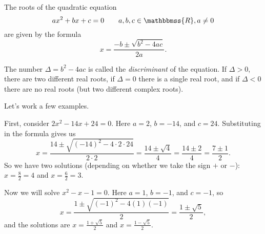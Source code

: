 \documentclass[12pt]{article}
\newcommand{\R}{\mathbbmss{R}}
\begin{document}
The roots of the quadratic equation
\[
  ax^2+bx+c=0\qquad{a,b,c\in\R,a\neq 0}
\]
are given by the formula
\[
  x=\frac{-b\pm\sqrt{b^2-4ac}}{2a}.
\]

The number $\Delta=b^2-4ac$ is called the \emph{discriminant} of the equation.
If $\Delta>0$, there are two different real roots,
if $\Delta=0$ there is a single real root,
and if $\Delta<0$ there are no real roots (but two different complex roots).

Let's work a few examples.

First, consider $2x^2-14x+24=0$.
Here $a=2$, $b=-14$, and $c=24$.
Substituting in the formula gives us
\[
  x=\frac{14\pm \sqrt{(-14)^2-4\cdot2\cdot24}}{2\cdot 2}
   =\frac{14\pm\sqrt{4}}{4}
   =\frac{14\pm2}{4}
   =\frac{7\pm1}{2}.
\]
So we have two solutions (depending on whether we take the sign $+$ or $-$):
$x=\frac{8}{2}=4$ and $x=\frac{6}{2}=3$.

Now we will solve $x^2-x-1=0$.
Here $a=1$, $b=-1$, and $c=-1$, so
\[
  x=\frac{1\pm\sqrt{(-1)^2-4(1)(-1)}}{2}
   =\frac{1\pm{\sqrt{5}}}{2},
\]
and the solutions are $x=\frac{1+\sqrt{5}}{2}$ and $x=\frac{1-\sqrt{5}}{2}$.
\end{document}
